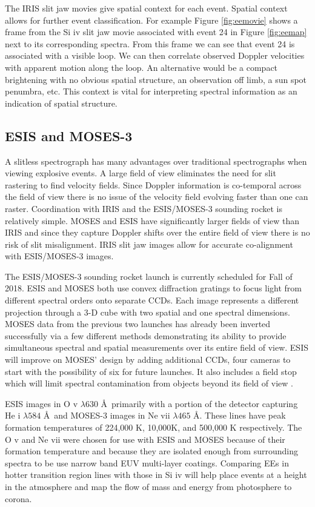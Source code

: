 \documentclass[]{aastex6}
\begin{document}
	The IRIS slit jaw movies give spatial context for each event.  Spatial context allows for further event classification. For example Figure \ref{fig:eemovie} shows a frame from the Si {\sc iv} slit jaw movie associated with event 24 in Figure \ref{fig:eemap} next to its corresponding spectra.  From this frame we can see that event 24 is associated with a visible loop.  We can then correlate observed Doppler velocities with apparent motion along the loop.  An alternative would be a compact brightening with no obvious spatial structure, an observation off limb, a sun spot penumbra, etc.  This context is vital for interpreting spectral information as an indication of spatial structure.
	

	\subsection{ESIS and MOSES-3}
	A slitless spectrograph has many advantages over traditional spectrographs when viewing explosive events.  A large field of view eliminates the need for slit rastering to find velocity fields.  Since Doppler information is co-temporal across the field of view there is no issue of the velocity field evolving faster than one can raster. Coordination with IRIS and the ESIS/MOSES-3 sounding rocket is relatively simple. MOSES and ESIS have significantly larger fields of view than IRIS and since they capture Doppler shifts over the entire field of view there is no risk of slit misalignment.  IRIS slit jaw images allow for accurate co-alignment with ESIS/MOSES-3 images.
	
	The ESIS/MOSES-3 sounding rocket launch is currently scheduled for Fall of 2018.  ESIS and MOSES both use convex diffraction gratings to focus light from different spectral orders onto separate CCDs.  Each image represents a different projection through a 3-D cube with two spatial and one spectral dimensions.  MOSES data from the previous two launches has already been inverted successfully via a few different methods \citep{Fox2010,Courrier2015,Smart2016,Smart2017,Rust2017} demonstrating its ability to provide simultaneous spectral and spatial measurements over its entire field of view.  ESIS will improve on MOSES' design by adding additional CCDs, four cameras to start with the possibility of six for future launches.  It also includes a field stop which will limit spectral contamination from objects beyond its field of view \citep{Parker2016}.
	
	ESIS images in O {\sc v} $\lambda 630$ \AA \ primarily with a portion of the detector capturing He {\sc i} $\lambda 584$ \AA \ and MOSES-3 images in Ne {\sc vii} $\lambda 465$ \AA.  These lines have peak formation temperatures of 224,000 K, 10,000K, and 500,000 K respectively. The O {\sc v} and Ne {\sc vii} were chosen for use with ESIS and MOSES because of their formation temperature and because they are isolated enough from surrounding spectra to be use narrow band EUV multi-layer coatings.  Comparing EEs in hotter transition region lines with those in Si {\sc iv} will help place events at a height in the atmosphere and map the flow of mass and energy from photosphere to corona.
	
\end{document}
